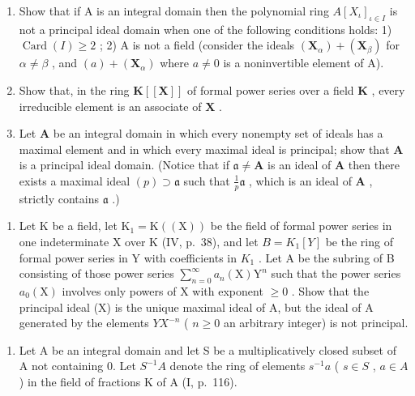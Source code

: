 \begin{enumerate}
\def\labelenumi{\arabic{enumi})}
\item
  Show that if A is an integral domain then the polynomial ring \(A[X_{\iota}]_{\iota \in I}\) is not a principal ideal domain when one of the following conditions holds: 1) \(\operatorname{Card}(I) \geqslant 2\) ; 2) A is not a field (consider the ideals \((\mathbf{X}_{\alpha}) + (\mathbf{X}_{\beta})\) for \(\alpha \neq \beta\) , and \((a) + (\mathbf{X}_{\alpha})\) where \(a \neq 0\) is a noninvertible element of A).
\item
  Show that, in the ring \(\mathbf{K}[[\mathbf{X}]]\) of formal power series over a field \(\mathbf{K}\) , every irreducible element is an associate of \(\mathbf{X}\) .
\item
  Let \(\mathbf{A}\) be an integral domain in which every nonempty set of ideals has a maximal element and in which every maximal ideal is principal; show that \(\mathbf{A}\) is a principal ideal domain. (Notice that if \(\mathfrak{a} \neq \mathbf{A}\) is an ideal of \(\mathbf{A}\) then there exists a maximal ideal \((p) \supset \mathfrak{a}\) such that \(\frac{1}{p} \mathfrak{a}\) , which is an ideal of \(\mathbf{A}\) , strictly contains \(\mathfrak{a}\) .)
\end{enumerate}

\begin{enumerate}
\def\labelenumi{\alph{enumi})}
\setcounter{enumi}{1}
\tightlist
\item
  Let K be a field, let \(\mathrm{K}_{1}=\mathrm{K}((\mathrm{X}))\) be the field of formal power series in one indeterminate X over K (IV, p.~38), and let \(B=K_{1}[Y]\) be the ring of formal power series in Y with coefficients in \(K_{1}\) . Let A be the subring of B consisting of those power series \(\sum_{n=0}^{\infty}a_{n}(\mathrm{X})\mathrm{Y}^{n}\) such that the power series \(a_{0}(\mathrm{X})\) involves only powers of X with exponent \(\geqslant 0\) . Show that the principal ideal (X) is the unique maximal ideal of A, but the ideal of A generated by the elements \(YX^{-n}\) ( \(n \geqslant 0\) an arbitrary integer) is not principal.
\end{enumerate}

\begin{enumerate}
\def\labelenumi{\arabic{enumi})}
\setcounter{enumi}{3}
\tightlist
\item
  Let A be an integral domain and let S be a multiplicatively closed subset of A not containing 0. Let \(S^{-1}A\) denote the ring of elements \(s^{-1}a\) ( \(s \in S\) , \(a \in A\) ) in the field of fractions K of A (I, p.~116).
\end{enumerate}

